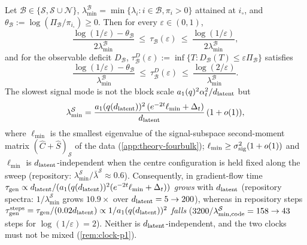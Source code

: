 \begin{proposition}\label{prop:taugen-p1}
Let $\mathcal B\in\{\mathcal S,\mathcal S\cup\mathcal N\}$, $\lambda^{\mathcal B}_{\min}=\min\{\lambda_i:i\in\mathcal B,\pi_i>0\}$ attained at $i_\circ$, and $\theta_{\mathcal B}:=\log(\Pi_{\mathcal B}/\pi_{i_\circ})\ge0$. Then for every $\varepsilon\in(0,1)$,
\begin{equation}\label{eq:taugen-bounds-p1}
\frac{\log(1/\varepsilon)-\theta_{\mathcal B}}{2\lambda^{\mathcal B}_{\min}}\ \le\ \tau_{\mathcal B}(\varepsilon)\ \le\ \frac{\log(1/\varepsilon)}{2\lambda^{\mathcal B}_{\min}},
\end{equation}
and for the observable deficit $D_{\mathcal B}$, $\tau^D_{\mathcal B}(\varepsilon):=\inf\{T:D_{\mathcal B}(T)\le\varepsilon\Pi_{\mathcal B}\}$ satisfies
\[
\frac{\log(1/\varepsilon)-\theta_{\mathcal B}}{\lambda^{\mathcal B}_{\min}}\ \le\ \tau^D_{\mathcal B}(\varepsilon)\ \le\ \frac{\log(2/\varepsilon)}{\lambda^{\mathcal B}_{\min}} .
\]
The slowest signal mode is not the block scale $a_1(q)^2\alpha_t^2/d_{\mathrm{latent}}$ but
\begin{equation}\label{eq:lammin-signal-p1}
\lambda^{\mathcal S}_{\min}=\frac{a_1(q(d_{\mathrm{latent}}))^2\,(e^{-2t}\ell_{\min}+\Delta_t)}{d_{\mathrm{latent}}}\,(1+o(1)),
\end{equation}
where $\ell_{\min}$ is the smallest eigenvalue of the signal-subspace second-moment matrix $(\hat C+\hat S)_{\mathcal S}$ of the data (\cref{app:theory-fourbulk}); $\ell_{\min}\ge\sigma_{\mathrm{sig}}^2(1+o(1))$ and $\ell_{\min}$ is $d_{\mathrm{latent}}$-independent when the centre configuration is held fixed along the sweep (repository: $\lambda^{\mathcal S}_{\min}/\bar\lambda^{\mathcal S}\approx0.6$). Consequently, in gradient-flow time $\tau_{\mathrm{gen}}\propto d_{\mathrm{latent}}/(a_1(q(d_{\mathrm{latent}}))^2(e^{-2t}\ell_{\min}+\Delta_t))$ \emph{grows} with $d_{\mathrm{latent}}$ (repository spectra: $1/\lambda^{\mathcal S}_{\min}$ grows $10.9\times$ over $d_{\mathrm{latent}}=5\to200$), whereas in repository steps $\tau_{\mathrm{gen}}^{\rm steps}=\tau_{\mathrm{gen}}/(0.02d_{\mathrm{latent}})\propto1/a_1(q(d_{\mathrm{latent}}))^2$ \emph{falls} ($3200/\lambda^{\mathcal S}_{\min,\rm code}=158\to43$ steps for $\log(1/\varepsilon)=2$). Neither is $d_{\mathrm{latent}}$-independent, and the two clocks must not be mixed (\cref{rem:clock-p1}).
\end{proposition}
